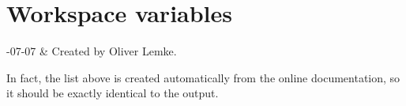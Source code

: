 \chapter{Workspace variables}
\label{app:variables}


-07-07 & Created by Oliver Lemke. \\
\stophistory



\noindent
In fact, the list above is created automatically from the online
documentation, so it should be exactly identical to the
 output. 


